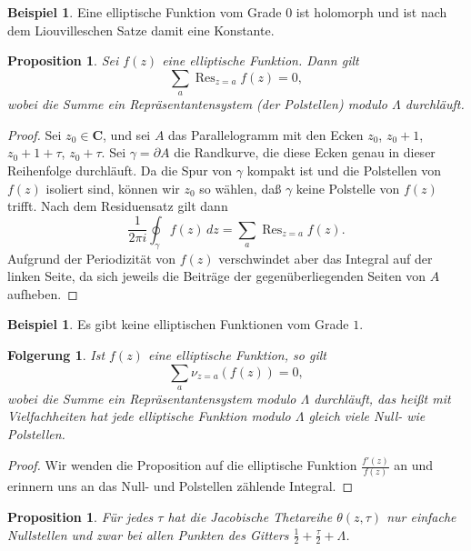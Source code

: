 \documentclass[a4paper,twoside,openright]{report}
\newtheorem{prop}[thm]{Proposition}
\newtheorem{cor}[thm]{Folgerung}
\theoremstyle{definition}
\newtheorem{xca}[thm]{Beispiel}
\theoremstyle{remark}
\DeclareMathOperator{\Res}{Res}
\begin{document}
\begin{xca}
  Eine elliptische Funktion vom Grade $0$ ist holomorph und ist nach dem Liouvilleschen
  Satze damit eine Konstante.
\end{xca}

\begin{prop}
  Sei $f(z)$ eine elliptische Funktion. Dann gilt
  \[
    \sum_a \Res_{z = a} f(z) = 0,
  \]
  wobei die Summe ein Repräsentantensystem (der Polstellen) modulo $\Lambda$ 
  durchläuft.
\end{prop}

\begin{proof}
  Sei $z_0 \in \mathbf C$, und sei $A$ das Parallelogramm mit den
  Ecken $z_0$, $z_0 + 1$, $z_0 + 1 + \tau$, $z_0 + \tau$. Sei $\gamma = \partial A$
  die Randkurve, die diese Ecken genau in dieser Reihenfolge durchläuft.
  Da die Spur von $\gamma$ kompakt ist und die Polstellen von $f(z)$ isoliert sind,
  können wir $z_0$ so wählen, daß $\gamma$ keine Polstelle von $f(z)$ trifft.
  Nach dem Residuensatz gilt dann
  \[
    \frac 1{2\pi i} \oint_\gamma f(z) \, dz = \sum_a \Res_{z = a} f(z).
  \]
  Aufgrund der Periodizität von $f(z)$ verschwindet aber das Integral auf der
  linken Seite, da sich jeweils die Beiträge der gegenüberliegenden Seiten von
  $A$ aufheben.
\end{proof}

\begin{xca}
  Es gibt keine elliptischen Funktionen vom Grade $1$.
\end{xca}

\begin{cor}
  Ist $f(z)$ eine elliptische Funktion, so gilt
  \[
    \sum_a \nu_{z = a} (f(z)) = 0,
  \]
  wobei die Summe ein Repräsentantensystem modulo $\Lambda$ durchläuft, das heißt
  mit Vielfachheiten hat jede elliptische Funktion modulo $\Lambda$ gleich viele
  Null- wie Polstellen.
\end{cor}

\begin{proof}
  Wir wenden die Proposition auf die elliptische Funktion $\frac{f'(z)}{f(z)}$
  an und erinnern uns an das Null- und Polstellen zählende Integral.
\end{proof}

\begin{prop}
  Für jedes $\tau$ hat die Jacobische Thetareihe $\theta(z, \tau)$ nur einfache
  Nullstellen und zwar bei allen Punkten des Gitters $\frac 1 2 + \frac \tau 2 + \Lambda$.
\end{prop}
\end{document}
